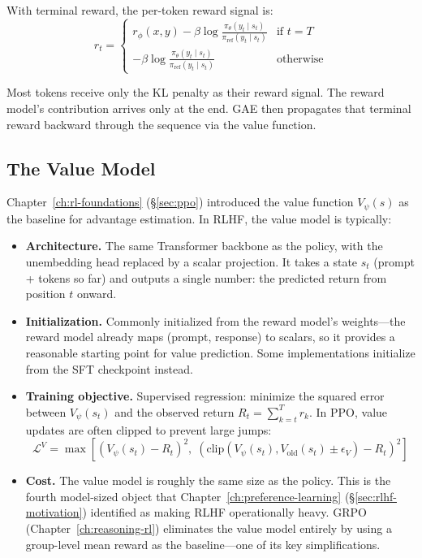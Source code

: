 With terminal reward, the per-token reward signal is:
\begin{equation}
\label{eq:per-token-reward}
r_t = \begin{cases}
r_\phi(x, y) - \beta \log \frac{\pi_\theta(y_t \mid s_t)}{\pi_{\text{ref}}(y_t \mid s_t)} & \text{if } t = T \\
- \beta \log \frac{\pi_\theta(y_t \mid s_t)}{\pi_{\text{ref}}(y_t \mid s_t)} & \text{otherwise}
\end{cases}
\end{equation}

Most tokens receive only the KL penalty as their reward signal. The reward model's contribution arrives only at the end. GAE then propagates that terminal reward backward through the sequence via the value function.

\subsection{The Value Model}

Chapter~\ref{ch:rl-foundations} (\S\ref{sec:ppo}) introduced the value function $V_\psi(s)$ as the baseline for advantage estimation. In RLHF, the value model is typically:

\begin{itemize}[nosep]
  \item \textbf{Architecture.} The same Transformer backbone as the policy, with the unembedding head replaced by a scalar projection. It takes a state $s_t$ (prompt + tokens so far) and outputs a single number: the predicted return from position $t$ onward.
  \item \textbf{Initialization.} Commonly initialized from the reward model's weights---the reward model already maps (prompt, response) to scalars, so it provides a reasonable starting point for value prediction. Some implementations initialize from the SFT checkpoint instead.
  \item \textbf{Training objective.} Supervised regression: minimize the squared error between $V_\psi(s_t)$ and the observed return $R_t = \sum_{k=t}^{T} r_k$. In PPO, value updates are often clipped to prevent large jumps:
  \begin{equation}
  \mathcal{L}^{V} = \max\!\left[(V_\psi(s_t) - R_t)^2, \;(\text{clip}(V_\psi(s_t), V_{\text{old}}(s_t) \pm \epsilon_V) - R_t)^2\right]
  \end{equation}
  \item \textbf{Cost.} The value model is roughly the same size as the policy. This is the fourth model-sized object that Chapter~\ref{ch:preference-learning} (\S\ref{sec:rlhf-motivation}) identified as making RLHF operationally heavy. GRPO (Chapter~\ref{ch:reasoning-rl}) eliminates the value model entirely by using a group-level mean reward as the baseline---one of its key simplifications.
\end{itemize}

